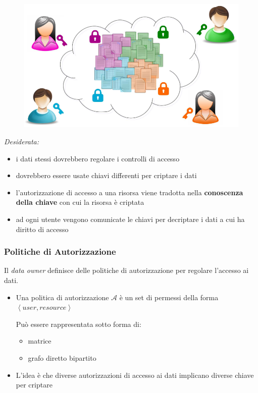 \documentclass{report}
\begin{document}
\begin{figure}[ht]
    \centering
    \includegraphics[width=0.7\linewidth]{images/encryption/selective.png}
\end{figure}

\textit{Desiderata:}
\begin{itemize}
    \item i dati stessi dovrebbero regolare i controlli di accesso 
    \item dovrebbero essere usate chiavi differenti per criptare i dati 
    \item l'autorizzazione di accesso a una risorsa viene tradotta nella \textbf{conoscenza della chiave} con cui la risorsa è criptata 
    \item ad ogni utente vengono comunicate le chiavi per decriptare i dati a cui ha diritto di accesso
\end{itemize}

\subsubsection{Politiche di Autorizzazione}
Il \textit{data owner} definisce delle politiche di autorizzazione per regolare l'accesso ai dati.

\begin{itemize}
    \item Una politica di autorizzazione $\mathcal{A}$ è un set di permessi della forma $\left\langle user, resource \right\rangle$
    
    \noindent Può essere rappresentata sotto forma di:
    \begin{itemize}
        \item matrice 
        \item grafo diretto bipartito
    \end{itemize}
    \item L'idea è che diverse autorizzazioni di accesso ai dati implicano diverse chiave per criptare 
\end{itemize}
\end{document}
